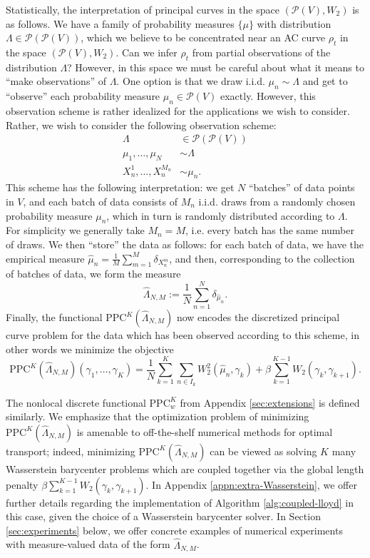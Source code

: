 \documentclass[aos, preprint]{imsart}
\theoremstyle{plain}
\theoremstyle{remark}
\begin{document}
{Statistically, the interpretation of principal curves in the space
$(\mathcal{P}(V),W_{2})$ is as follows. We have a family of probability
measures $\{\mu\}$ with distribution $\Lambda\in\mathcal{P}(\mathcal{P}(V))$, which we believe to be concentrated near an AC
curve $\rho_{t}$ in the space $(\mathcal{P}(V),W_{2})$.
Can we infer $\rho_{t}$ from partial observations of the distribution
$\Lambda$? However, in this space we must be careful about what it
means to ``make observations'' of $\Lambda$. One option is that
we draw i.i.d. $\mu_{n}\sim\Lambda$ and get to ``observe'' each
probability measure $\mu_{n}\in\mathcal{P}(V)$ exactly. However,
this observation scheme is rather idealized for the applications we
wish to consider. Rather, we wish to consider the following observation
scheme:
\begin{align*}
\Lambda & \in\mathcal{P}(\mathcal{P}(V))\\
\mu_{1},\ldots,\mu_{N} & \sim\Lambda\\
X_{n}^{1},\ldots,X_{n}^{M_n} & \sim\mu_{n}.
\end{align*}
This scheme has the following interpretation: we get $N$ ``batches''
of data points in $V$, and each batch of data consists of $M_n$ i.i.d. draws from a randomly
chosen probability measure $\mu_{n}$, which in turn is randomly distributed
according to $\Lambda$. For simplicity we generally take $M_n=M$, i.e. every batch has the same number of draws.  We then ``store'' the data as follows: for
each batch of data, we have the empirical measure $\hat{\mu}_{n}=\frac{1}{M}\sum_{m=1}^M\delta_{X_{n}^{m}}$,
and then, corresponding to the collection of batches of data, we form
the measure
\[
\hat{\Lambda}_{N,M}:=\frac{1}{N}\sum_{n=1}^{N}\delta_{\hat{\mu}_{n}}.
\]
Finally, the functional $\text{PPC}^{K}(\hat{\Lambda}_{N,M})$ now
encodes the discretized principal curve problem for the data which
has been observed according to this scheme, in other words we minimize the objective
\[
\text{PPC}^{K}(\hat{\Lambda}_{N,M})(\gamma_{1},\ldots,\gamma_{K})=\frac{1}{N}\sum_{k=1}^{K}\sum_{n\in I_{k}}W_{2}^{2}(\hat{\mu}_{n},\gamma_{k})+\beta\sum_{k=1}^{K-1}W_{2}(\gamma_{k},\gamma_{k+1}).
\]

The nonlocal discrete functional $\text{PPC}_{w}^{K}$ from Appendix \ref{sec:extensions} is defined similarly.
We emphasize that the optimization problem of minimizing $\text{PPC}^{K}(\hat{\Lambda}_{N,M})$ is amenable to off-the-shelf numerical methods for optimal transport; indeed, minimizing $\text{PPC}^{K}(\hat{\Lambda}_{N,M})$ can be viewed as solving $K$ many Wasserstein barycenter problems which are coupled together via the global length penalty $\beta\sum_{k=1}^{K-1}W_{2}(\gamma_{k},\gamma_{k+1})$. In Appendix \ref{appn:extra-Wasserstein}, we offer further details regarding the implementation of Algorithm \ref{alg:coupled-lloyd} in this case, given the choice of a Wasserstein barycenter solver. In Section \ref{sec:experiments} below, we offer concrete examples of numerical experiments with measure-valued data of the form $\hat\Lambda_{N,M}$.

}
\end{document}
